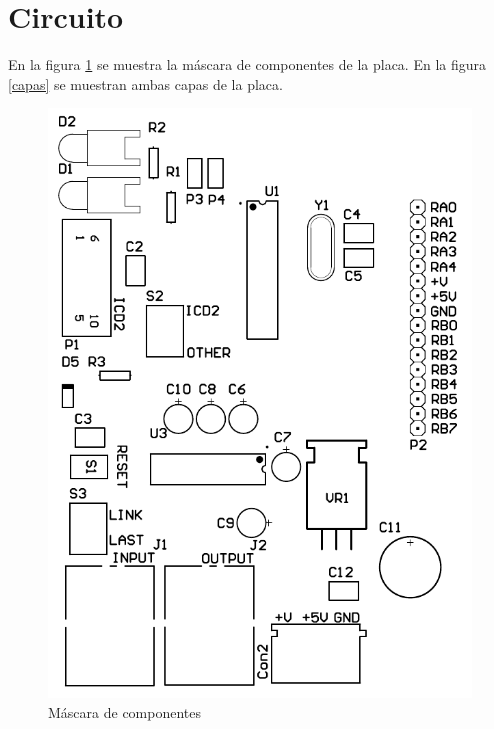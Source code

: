 \documentclass[a4paper,10pt]{article}
\begin{document}
\section{Circuito}
\label{circuito}

En la figura \ref{componentes} se muestra la m\'ascara de componentes de la placa.
En la figura \ref{capas} se muestran ambas capas de la placa.

\begin{figure}
\centering
\includegraphics[scale=.2]{componentes.png}
\caption{M\'ascara de componentes}
\label{componentes}
\end{figure}
\end{document}
